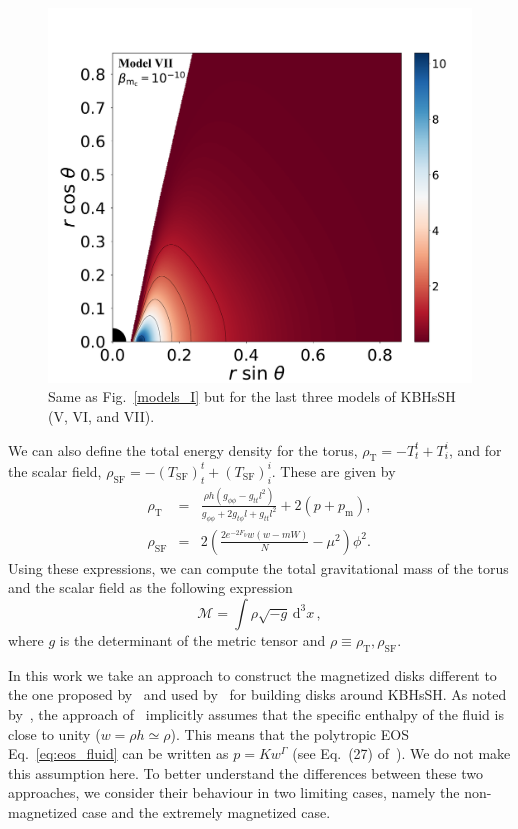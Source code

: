 \documentclass[twocolumn,aps,showpacs,showkeys,prd,superscriptaddress,byrevtex, amsmath]{revtex4-1}
\begin{document}
\begin{figure}
\includegraphics[scale=0.14]{figures/fig2_VII__10.pdf}
\hspace{-0.2cm}
\caption{Same as Fig.~\ref{models_I} but for the last three models of KBHsSH (V, VI, and VII).}
\label{models_II}
\end{figure}

We can also define the total energy density for the torus, $\rho_{\mathrm{T}}=-T^t_t + T^i_i$, and for the scalar field, $\rho_{\mathrm{SF}}=-(T_{\mathrm{SF}})^t_t + (T_{\mathrm{SF}})^i_i$. These are given by
\begin{eqnarray}\label{eq:torus_energy_density}
\rho_{\mathrm{T}} &=&  \frac{\rho h (g_{\phi\phi} - g_{tt} l^2)}{g_{\phi\phi} + 2 g_{t\phi} l + g_{tt} l^2} + 2 (p + p_{\mathrm{m}}),
\\
\rho_{\mathrm{SF}} &=&  2 \left(\frac{2 e^{-2 F_0} w (w-m W)}{N} - \mu^2\right) \phi^2.
\end{eqnarray}
Using these expressions, we can compute the total gravitational mass of the torus and the scalar field as the following expression
\begin{equation}\label{eq:mass_integral}
\mathcal{M} = \int  \rho \sqrt{-g}\,\mathrm{d}^3x\,,
\end{equation}
where $g$ is the determinant of the metric tensor and $\rho\equiv \rho_{\mathrm{T}}, \rho_{\mathrm{SF}}$.

In this work we take an approach to construct the magnetized disks different to the one proposed by~\citep{Komissarov:2006} and used by~\cite{Vincent:2016} for building disks around KBHsSH. As noted by~\cite{Gimeno-Soler:2017}, the approach of~\citep{Komissarov:2006} implicitly assumes that the specific enthalpy of the fluid is close to unity ($w = \rho h \simeq \rho$). This means that the polytropic EOS Eq.~\eqref{eq:eos_fluid} can be written as $p = K w^{\Gamma}$ (see Eq.~(27) of~\cite{Komissarov:2006}). We do not make this assumption here. To better understand the differences between these two approaches, we consider their behaviour in two limiting cases, namely the non-magnetized case and the extremely magnetized case.
\end{document}
